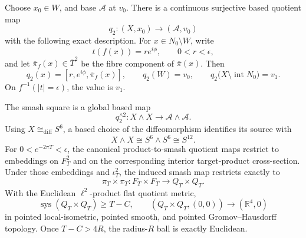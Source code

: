 \begin{theorem}
\label{cusp-cone-S12-route}
Choose \(x_0\in W\), and base \(\mathcal A\) at \(v_0\).  There is a
continuous surjective based quotient map
\begin{equation}
 q_2:(X,x_0)\longrightarrow(\mathcal A,v_0)
 \label{cusp-cone-q2}
\end{equation}
with the following exact description.  For \(x\in N_0\setminus W\), write
\[
 t(f(x))=re^{i\phi},\qquad 0<r<\epsilon,
\]
and let \(\overline\pi_f(x)\in\overline T^2\) be the fibre component of
\(\overline\pi(x)\).  Then
\begin{equation}
 q_2(x)=[r,e^{i\phi},\overline\pi_f(x)],\qquad
 q_2(W)=v_0,\qquad
 q_2\bigl(X\setminus\operatorname{int}N_0\bigr)=v_1.
 \label{cusp-cone-q2-formula}
\end{equation}
On \(f^{-1}(|t|=\epsilon)\), the value is \(v_1\).

The smash square is a global based map
\begin{equation}
 q_2^{\wedge2}:X\wedge X\longrightarrow
 \mathcal A\wedge\mathcal A.
 \label{cusp-cone-S12-map}
\end{equation}
Using \(X\cong_{\mathrm{diff}}S^6\), a based choice of the diffeomorphism
identifies its source with
\begin{equation}
 X\wedge X\cong S^6\wedge S^6\cong S^{12}.
 \label{cusp-cone-S12-source}
\end{equation}
For \(0<e^{-2\pi T}<\epsilon\), the canonical product-to-smash quotient
maps restrict to embeddings on \(F_T^2\) and on the corresponding interior
target-product cross-section.  Under those embeddings and \(\iota_T^2\),
the induced smash map restricts exactly to
\begin{equation}
 \pi_T\times\pi_T:F_T\times F_T\longrightarrow Q_T\times Q_T.
 \label{cusp-cone-S12-fibre-map}
\end{equation}
With the Euclidean \(\ell^2\)-product flat quotient metric,
\begin{equation}
 \operatorname{sys}(Q_T\times Q_T)\geq T-C,\qquad
 (Q_T\times Q_T,(0,0))\longrightarrow(\mathbb R^4,0)
 \label{cusp-cone-S12-R4-limit}
\end{equation}
in pointed local-isometric, pointed smooth, and pointed
Gromov--Hausdorff topology.  Once \(T-C>4R\), the radius-\(R\) ball is
exactly Euclidean.


\end{theorem}
